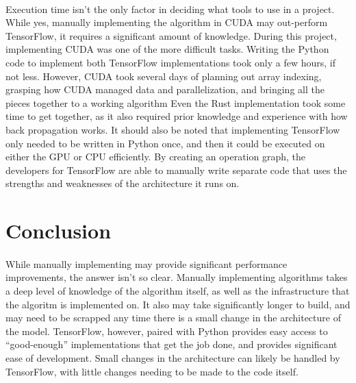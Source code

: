 \documentclass[12pt]{article}
\begin{document}
\paragraph{} %
Execution time isn't the only factor in deciding what tools to use in a project.
While yes, manually implementing the algorithm in CUDA may out-perform TensorFlow, it requires a significant amount of knowledge.
During this project, implementing CUDA was one of the more difficult tasks.
Writing the Python code to implement both TensorFlow implementations took only a few hours, if not less.
However, CUDA took several days of planning out array indexing, grasping how CUDA managed data and parallelization, and bringing all the pieces together to a working algorithm
Even the Rust implementation took some time to get together, as it also required prior knowledge and experience with how back propagation works.
It should also be noted that implementing TensorFlow only needed to be written in Python once, and then it could be executed on either the GPU or CPU efficiently.
By creating an operation graph, the developers for TensorFlow are able to manually write separate code that uses the strengths and weaknesses of the architecture it runs on.


%


\section{Conclusion}

\paragraph{}
While manually implementing may provide significant performance improvements, the answer isn't so clear.
Manually implementing algorithms takes a deep level of knowledge of the algorithm itself, as well as the infrastructure that the algoritm is implemented on.
It also may take significantly longer to build, and may need to be scrapped any time there is a small change in the architecture of the model.
TensorFlow, however, paired with Python provides easy access to ``good-enough'' implementations that get the job done, and provides significant ease of development.
Small changes in the architecture can likely be handled by TensorFlow, with little changes needing to be made to the code itself.
\end{document}
